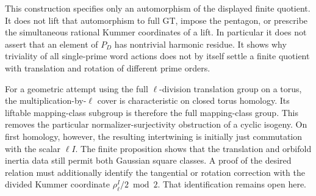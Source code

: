 This construction specifies only an automorphism of the displayed
finite quotient. It does not lift that automorphism to full GT,
impose the pentagon, or prescribe the simultaneous rational
Kummer coordinates of a lift. In particular it does not assert
that an element of \(P_D\) has nontrivial harmonic residue.
It shows why triviality of all single-prime word actions does
not by itself settle a finite quotient with translation and
rotation of different prime orders.

For a geometric attempt using the full \(\ell\)-division
translation group on a torus, the multiplication-by-\(\ell\)
cover is characteristic on closed torus homology. Its liftable
mapping-class subgroup is therefore the full mapping-class
group. This removes the particular normalizer-surjectivity
obstruction of a cyclic isogeny. On first homology, however,
the resulting intertwining is initially just commutation with
the scalar \(\ell I\). The finite proposition shows that the
translation and orbifold inertia data still permit both
Gaussian square classes. A proof of the desired relation
must additionally identify the tangential or rotation
correction with the divided Kummer coordinate
\(\rho_\ell^I/2\bmod2\). That identification remains open here.
